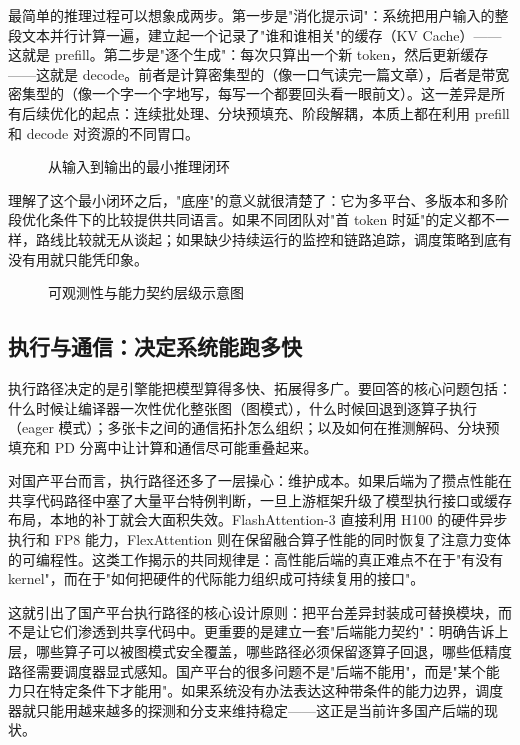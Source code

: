 最简单的推理过程可以想象成两步。第一步是"消化提示词"：系统把用户输入的整段文本并行计算一遍，建立起一个记录了"谁和谁相关"的缓存（KV Cache）——这就是 prefill。第二步是"逐个生成"：每次只算出一个新 token，然后更新缓存——这就是 decode。前者是计算密集型的（像一口气读完一篇文章），后者是带宽密集型的（像一个字一个字地写，每写一个都要回头看一眼前文）。这一差异是所有后续优化的起点：连续批处理、分块预填充、阶段解耦，本质上都在利用 prefill 和 decode 对资源的不同胃口\citep{orca2023,sarathi2023,zhong2024distserve}。

\begin{figure}[!htb]
\centering
\resizebox{0.97\linewidth}{!}{}
\caption{从输入到输出的最小推理闭环}
\label{fig:minimal-inference-loop}
\end{figure}

理解了这个最小闭环之后，"底座"的意义就很清楚了：它为多平台、多版本和多阶段优化条件下的比较提供共同语言。如果不同团队对"首 token 时延"的定义都不一样，路线比较就无从谈起；如果缺少持续运行的监控和链路追踪，调度策略到底有没有用就只能凭印象。

\begin{figure}[!htb]
\centering
\resizebox{0.85\linewidth}{!}{}
\caption{可观测性与能力契约层级示意图}
\label{fig:observability-contract-stack}
\end{figure}

\subsection{执行与通信：决定系统能跑多快}

执行路径决定的是引擎能把模型算得多快、拓展得多广。要回答的核心问题包括：什么时候让编译器一次性优化整张图（图模式），什么时候回退到逐算子执行（eager 模式）；多张卡之间的通信拓扑怎么组织；以及如何在推测解码、分块预填充和 PD 分离中让计算和通信尽可能重叠起来。

对国产平台而言，执行路径还多了一层操心：维护成本。如果后端为了攒点性能在共享代码路径中塞了大量平台特例判断，一旦上游框架升级了模型执行接口或缓存布局，本地的补丁就会大面积失效。FlashAttention-3 直接利用 H100 的硬件异步执行和 FP8 能力，FlexAttention 则在保留融合算子性能的同时恢复了注意力变体的可编程性\citep{shah2024flashattention3,dong2025flexattention}。这类工作揭示的共同规律是：高性能后端的真正难点不在于"有没有 kernel"，而在于"如何把硬件的代际能力组织成可持续复用的接口"。

这就引出了国产平台执行路径的核心设计原则：把平台差异封装成可替换模块，而不是让它们渗透到共享代码中。更重要的是建立一套"后端能力契约"：明确告诉上层，哪些算子可以被图模式安全覆盖，哪些路径必须保留逐算子回退，哪些低精度路径需要调度器显式感知。国产平台的很多问题不是"后端不能用"，而是"某个能力只在特定条件下才能用"。如果系统没有办法表达这种带条件的能力边界，调度器就只能用越来越多的探测和分支来维持稳定——这正是当前许多国产后端的现状。

